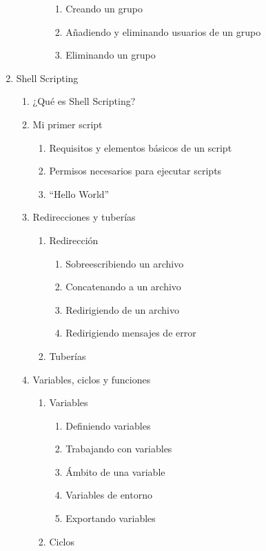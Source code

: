 \documentclass[12pt, letter-paper]{article}
\begin{document}
\begin{enumerate}
\begin{enumerate}
\begin{enumerate}
\begin{enumerate}
      \item Creando un grupo
      \item Añadiendo y eliminando usuarios de un grupo
      \item Eliminando un grupo
      \end{enumerate}
    \end{enumerate}
  \end{enumerate}
\item Shell Scripting
  \begin{enumerate}
  \item ¿Qué es Shell Scripting?
  \item Mi primer script
    \begin{enumerate}
    \item Requisitos y elementos básicos de un script
    \item Permisos necesarios para ejecutar scripts
    \item ``Hello World''
    \end{enumerate}
  \item Redirecciones y tuberías
    \begin{enumerate}
    \item Redirección
      \begin{enumerate}
      \item Sobreescribiendo un archivo
      \item Concatenando a un archivo
      \item Redirigiendo de un archivo
      \item Redirigiendo mensajes de error
      \end{enumerate}
    \item Tuberías
    \end{enumerate}
  \item Variables, ciclos y funciones
    \begin{enumerate}
    \item Variables
      \begin{enumerate}
      \item Definiendo variables
      \item Trabajando con variables
      \item Ámbito de una variable
      \item Variables de entorno           
      \item Exportando variables
      \end{enumerate}
    \item Ciclos
      \begin{enumerate}

\end{enumerate}
\end{enumerate}
\end{enumerate}
\end{enumerate}
\end{document}
